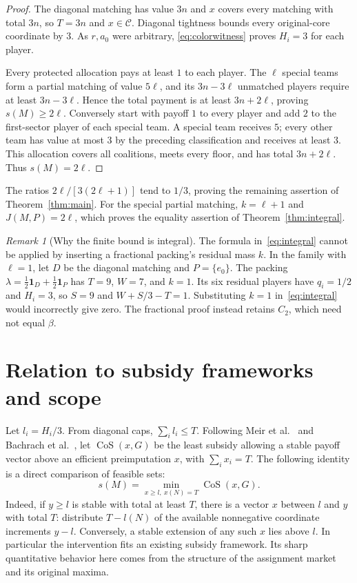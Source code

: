 \documentclass[11pt]{article}
\theoremstyle{remark}
\newtheorem{remark}[theorem]{Remark}
\newcommand{\core}{\mathcal C}
\newcommand{\one}{\mathbf 1}
\begin{document}
\begin{proof}
The diagonal matching has value $3n$ and $x$ covers every matching with
total $3n$, so $T=3n$ and $x\in\core$. Diagonal tightness bounds every
original-core coordinate by $3$. As $r,a_0$ were arbitrary,
\eqref{eq:colorwitness} proves $H_i=3$ for each player.

Every protected allocation pays at least $1$ to each player. The $\ell$
special teams form a partial matching of value $5\ell$, and its
$3n-3\ell$ unmatched players require at least $3n-3\ell$. Hence the
total payment is at least $3n+2\ell$, proving $s(M)\ge2\ell$.
Conversely start with payoff $1$ to every player and add $2$ to the
first-sector player of each special team. A special team receives $5$;
every other team has value at most $3$ by the preceding classification
and receives at least $3$. This allocation covers all coalitions, meets
every floor, and has total $3n+2\ell$. Thus $s(M)=2\ell$.
\end{proof}

The ratios $2\ell/[3(2\ell+1)]$ tend to $1/3$, proving the remaining
assertion of Theorem~\ref{thm:main}. For the special partial matching,
$k=\ell+1$ and $J(M,P)=2\ell$, which proves the equality assertion
of Theorem~\ref{thm:integral}.

\begin{remark}[Why the finite bound is integral]\label{rem:fractional}
The formula in~\eqref{eq:integral} cannot be applied by inserting a
fractional packing's residual mass $k$. In the family with $\ell=1$,
let $D$ be the diagonal matching and $P=\{e_0\}$. The packing
$\lambda=\tfrac12\one_D+\tfrac12\one_P$ has $T=9$, $W=7$, and
$k=1$. Its six residual players have $q_i=1/2$ and $H_i=3$, so $S=9$
and $W+S/3-T=1$. Substituting $k=1$ in~\eqref{eq:integral} would
incorrectly give zero. The fractional proof instead retains $C_2$,
which need not equal $\beta$.
\end{remark}

\section{Relation to subsidy frameworks and scope}\label{sec:framework}
Let $l_i=H_i/3$. From diagonal caps, $\sum_i l_i\le T$.
Following Meir et al.~\citep[Section~2.2]{Meir2011} and
Bachrach et al.~\citep[Section~5]{Bachrach2018}, let
$\operatorname{CoS}(x,G)$ be the least subsidy allowing a stable payoff
vector above an efficient preimputation $x$, with $\sum_ix_i=T$.
The following identity is a direct comparison of feasible sets:
\begin{equation}\label{eq:cos}
       s(M)=\min_{x\ge l,\ x(N)=T}\operatorname{CoS}(x,G).
\end{equation}
Indeed, if $y\ge l$ is stable with total at least $T$, there is a vector
$x$ between $l$ and $y$ with total $T$: distribute $T-l(N)$ of the
available nonnegative coordinate increments $y-l$. Conversely, a stable
extension of any such $x$ lies above $l$. In particular the intervention
fits an existing subsidy framework. Its sharp quantitative behavior here
comes from the structure of the assignment market and its original maxima.
\end{document}
